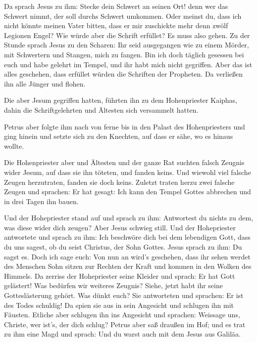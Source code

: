  Da sprach Jesus zu ihm: Stecke dein Schwert an seinen
Ort! denn wer das Schwert nimmt, der soll durchs Schwert umkommen.
 Oder meinst du, dass ich nicht könnte meinen Vater
bitten, dass er mir zuschickte mehr denn zwölf Legionen Engel?
 Wie würde aber die Schrift erfüllet? Es muss also gehen.
 Zu der Stunde sprach Jesus zu den Scharen: Ihr seid
ausgegangen wie zu einem Mörder, mit Schwertern und Stangen, mich zu
fangen. Bin ich doch täglich gesessen bei euch und habe gelehrt im
Tempel, und ihr habt mich nicht gegriffen.  Aber das ist
alles geschehen, dass erfüllet würden die Schriften der Propheten. Da
verließen ihn alle Jünger und flohen.

 Die aber Jesum gegriffen hatten, führten ihn zu dem
Hohenpriester Kaiphas, dahin die Schriftgelehrten und Ältesten sich
versammelt hatten.

 Petrus aber folgte ihm nach von ferne bis in den Palast
des Hohenpriesters und ging hinein und setzte sich zu den Knechten, auf
dass er sähe, wo es hinaus wollte.

 Die Hohenpriester aber und Ältesten und der ganze Rat
suchten falsch Zeugnis wider Jesum, auf dass sie ihn töteten,
 und fanden keins. Und wiewohl viel falsche Zeugen
herzutraten, fanden sie doch keins. Zuletzt traten herzu zwei falsche
Zeugen  und sprachen: Er hat gesagt: Ich kann den Tempel
Gottes abbrechen und in drei Tagen ihn bauen.

 Und der Hohepriester stand auf und sprach zu ihm:
Antwortest du nichts zu dem, was diese wider dich zeugen?
 Aber Jesus schwieg still. Und der Hohepriester
antwortete und sprach zu ihm: Ich beschwöre dich bei dem lebendigen
Gott, dass du uns sagest, ob du seist Christus, der Sohn Gottes.
 Jesus sprach zu ihm: Du sagst es. Doch ich sage euch:
Von nun an wird's geschehen, dass ihr sehen werdet des Menschen Sohn
sitzen zur Rechten der Kraft und kommen in den Wolken des Himmels.
 Da zerriss der Hohepriester seine Kleider und sprach: Er
hat Gott gelästert! Was bedürfen wir weiteres Zeugnis? Siehe, jetzt habt
ihr seine Gotteslästerung gehört.  Was dünkt euch? Sie
antworteten und sprachen: Er ist des Todes schuldig!  Da
spien sie aus in sein Angesicht und schlugen ihn mit Fäusten. Etliche
aber schlugen ihn ins Angesicht  und sprachen: Weissage
uns, Christe, wer ist's, der dich schlug?  Petrus aber
saß draußen im Hof; und es trat zu ihm eine Magd und sprach: Und du
warst auch mit dem Jesus aus Galiläa.

